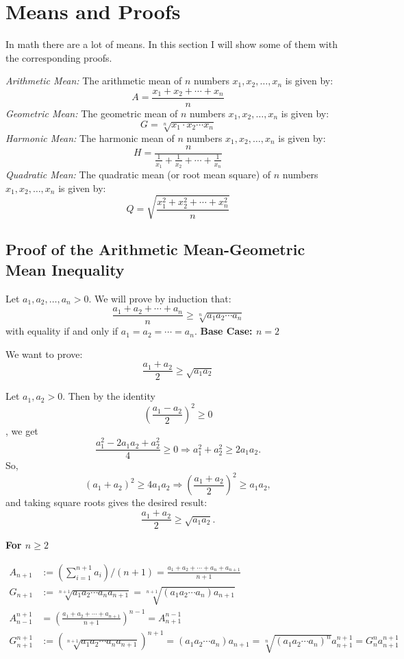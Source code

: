 \newpage
\section{Means and Proofs}
In math there are a lot of means. In this section I will show some of them with the corresponding proofs.

\emph{Arithmetic Mean:} The arithmetic mean of \( n \) numbers \( x_1, x_2, \dots, x_n \) is given by:
	      \[
		      A = \frac{x_1 + x_2 + \cdots + x_n}{n}
	      \]
\emph{Geometric Mean:} The geometric mean of \( n \) numbers \( x_1, x_2, \dots, x_n \) is given by:
	      \[
		      G = \sqrt[n]{x_1 \cdot x_2 \cdots x_n}
	      \]
\emph{Harmonic Mean:} The harmonic mean of \( n \) numbers \( x_1, x_2, \dots, x_n \) is given by:
	      \[
		      H = \frac{n}{\frac{1}{x_1} + \frac{1}{x_2} + \cdots + \frac{1}{x_n}}
	      \]
\emph{Quadratic Mean:} The quadratic mean (or root mean square) of \( n \) numbers \( x_1, x_2, \dots, x_n \) is given by:
	      \[
		      Q = \sqrt{\frac{x_1^2 + x_2^2 + \cdots + x_n^2}{n}}
	      \]

\subsection{Proof of the Arithmetic Mean-Geometric Mean Inequality}

Let \( a_1, a_2, \dots, a_n > 0 \). We will prove by induction that:
\[
	\frac{a_1 + a_2 + \cdots + a_n}{n} \geq \sqrt[n]{a_1 a_2 \cdots a_n}
\]
with equality if and only if \( a_1 = a_2 = \cdots = a_n \).
\newline
\textbf{Base Case: \( n = 2 \)}

We want to prove:
\[
	\frac{a_1 + a_2}{2} \geq \sqrt{a_1 a_2}
\]

Let \( a_1, a_2 > 0 \). Then by the identity
\[
	{\left( \frac{a_1 - a_2}{2} \right)}^2 \geq 0
\]
, we get
\[
	\frac{a_1^2 - 2a_1a_2 + a_2^2}{4} \geq 0 \Rightarrow a_1^2 + a_2^2 \geq 2a_1a_2.
\]
So,
\[
	{(a_1 + a_2)}^2 \geq 4a_1a_2 \Rightarrow {\left( \frac{a_1 + a_2}{2} \right)}^2 \geq a_1a_2,
\]
and taking square roots gives the desired result:
\[
	\frac{a_1 + a_2}{2} \geq \sqrt{a_1 a_2}.
\]

\textbf{For \( n \geq 2 \)}

\begin{align*}
	A_{n + 1} &:= (\sum_{i=1}^{n + 1} a_i) / (n + 1) = \frac{a_1 + a_2 + \cdots + a_n + a_{n + 1}}{n + 1}\\
	G_{n + 1} &:= \sqrt[n + 1]{a_1 a_2 \cdots a_n a_{n + 1}} = \sqrt[n + 1]{(a_1 a_2 \cdots a_n) a_{n + 1}}\\
	A_{n - 1}^{n + 1}&= {(\frac{a_1 + a_2 + \cdots + a_{n + 1}}{n + 1})}^{n - 1} = A_{n + 1}^{n - 1}\\
	G_{n + 1}^{n + 1} &:= {(\sqrt[n + 1]{a_1 a_2 \cdots a_n a_{n + 1}})}^{n + 1} = (a_1 a_2 \cdots a_n) a_{n + 1} = \sqrt[n]{{(a_1 a_2 \cdots a_n)}^{n}} a_{n + 1}^{n + 1} = G_{n}^{n} a_{n + 1}^{n + 1}
\end{align*}

